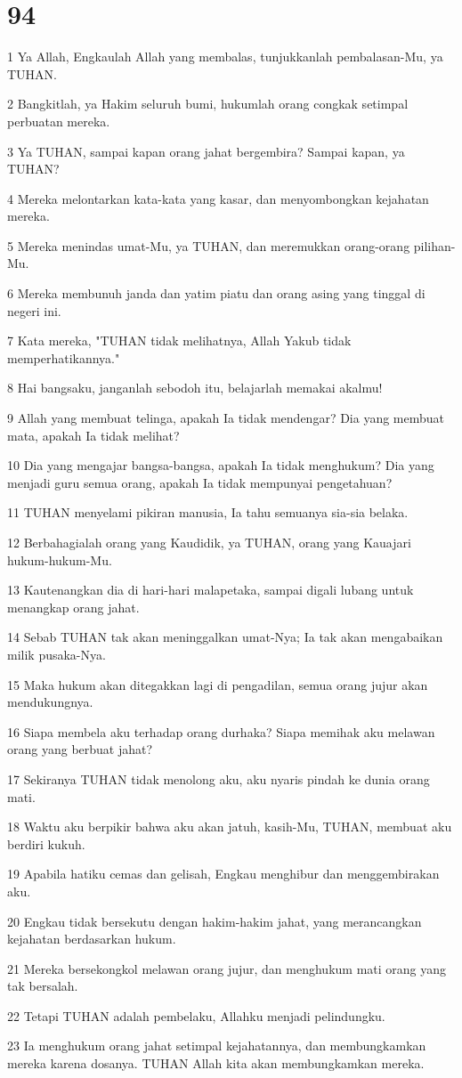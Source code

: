 \chapter{94}

\par 1 Ya Allah, Engkaulah Allah yang membalas, tunjukkanlah pembalasan-Mu, ya TUHAN.
\par 2 Bangkitlah, ya Hakim seluruh bumi, hukumlah orang congkak setimpal perbuatan mereka.
\par 3 Ya TUHAN, sampai kapan orang jahat bergembira? Sampai kapan, ya TUHAN?
\par 4 Mereka melontarkan kata-kata yang kasar, dan menyombongkan kejahatan mereka.
\par 5 Mereka menindas umat-Mu, ya TUHAN, dan meremukkan orang-orang pilihan-Mu.
\par 6 Mereka membunuh janda dan yatim piatu dan orang asing yang tinggal di negeri ini.
\par 7 Kata mereka, "TUHAN tidak melihatnya, Allah Yakub tidak memperhatikannya."
\par 8 Hai bangsaku, janganlah sebodoh itu, belajarlah memakai akalmu!
\par 9 Allah yang membuat telinga, apakah Ia tidak mendengar? Dia yang membuat mata, apakah Ia tidak melihat?
\par 10 Dia yang mengajar bangsa-bangsa, apakah Ia tidak menghukum? Dia yang menjadi guru semua orang, apakah Ia tidak mempunyai pengetahuan?
\par 11 TUHAN menyelami pikiran manusia, Ia tahu semuanya sia-sia belaka.
\par 12 Berbahagialah orang yang Kaudidik, ya TUHAN, orang yang Kauajari hukum-hukum-Mu.
\par 13 Kautenangkan dia di hari-hari malapetaka, sampai digali lubang untuk menangkap orang jahat.
\par 14 Sebab TUHAN tak akan meninggalkan umat-Nya; Ia tak akan mengabaikan milik pusaka-Nya.
\par 15 Maka hukum akan ditegakkan lagi di pengadilan, semua orang jujur akan mendukungnya.
\par 16 Siapa membela aku terhadap orang durhaka? Siapa memihak aku melawan orang yang berbuat jahat?
\par 17 Sekiranya TUHAN tidak menolong aku, aku nyaris pindah ke dunia orang mati.
\par 18 Waktu aku berpikir bahwa aku akan jatuh, kasih-Mu, TUHAN, membuat aku berdiri kukuh.
\par 19 Apabila hatiku cemas dan gelisah, Engkau menghibur dan menggembirakan aku.
\par 20 Engkau tidak bersekutu dengan hakim-hakim jahat, yang merancangkan kejahatan berdasarkan hukum.
\par 21 Mereka bersekongkol melawan orang jujur, dan menghukum mati orang yang tak bersalah.
\par 22 Tetapi TUHAN adalah pembelaku, Allahku menjadi pelindungku.
\par 23 Ia menghukum orang jahat setimpal kejahatannya, dan membungkamkan mereka karena dosanya. TUHAN Allah kita akan membungkamkan mereka.

